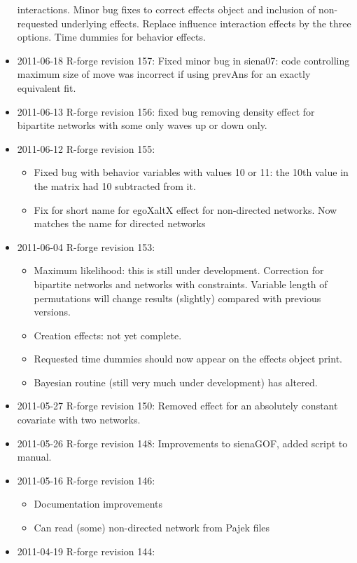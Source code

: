 \documentclass[a4paper,fleqn,11pt]{article}
\newcommand{\+}{\, + \,}
\begin{document}
\begin{small}
\begin{itemize}
  interactions. Minor bug fixes to correct effects object and inclusion of
  non-requested underlying effects. Replace influence interaction effects by the
  three options. Time dummies for behavior effects.
\item 2011-06-18 R-forge revision 157: Fixed minor bug in \textsf{siena07}: code
  controlling maximum size of move was incorrect if using prevAns for an exactly
  equivalent fit.
\item 2011-06-13 R-forge revision 156: fixed bug removing density effect for
  bipartite networks with some only waves up or down only.
\item 2011-06-12 R-forge revision 155:
\begin{itemize}
\item Fixed bug with behavior variables with values 10 or 11: the 10th value in
  the matrix had 10 subtracted from it.
\item Fix for short name for egoXaltX effect for non-directed networks. Now
  matches the name for directed networks
\end{itemize}
\item 2011-06-04 R-forge revision 153:
\begin{itemize}
\item Maximum likelihood: this is still under development. Correction for
  bipartite networks and networks with constraints. Variable length of
  permutations will change results (slightly) compared with previous versions.
\item Creation effects: not yet complete.
\item Requested time dummies should now appear on the effects object print.
\item Bayesian routine (still very much under development) has altered.
\end{itemize}
\item 2011-05-27 R-forge revision 150: Removed effect for an absolutely constant
  covariate with two networks.
\item 2011-05-26 R-forge revision 148:
Improvements to sienaGOF, added script to manual.
\item 2011-05-16 R-forge revision 146:
\begin{itemize}
\item Documentation improvements
\item Can read (some) non-directed network from Pajek files
\end{itemize}
\item 2011-04-19 R-forge revision 144:
\begin{itemize}

\end{itemize}
\end{itemize}
\end{small}
\end{document}
